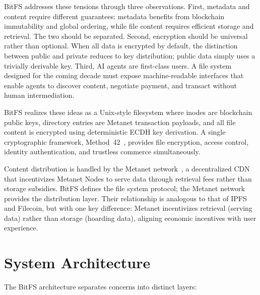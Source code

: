 \documentclass[11pt,a4paper]{article}
\begin{document}
BitFS addresses these tensions through three observations. First, metadata and content require different guarantees: metadata benefits from blockchain immutability and global ordering, while file content requires efficient storage and retrieval. The two should be separated. Second, encryption should be universal rather than optional. When all data is encrypted by default, the distinction between public and private reduces to key distribution; public data simply uses a trivially derivable key. Third, AI agents are first-class users. A file system designed for the coming decade must expose machine-readable interfaces that enable agents to discover content, negotiate payment, and transact without human intermediation.

BitFS realizes these ideas as a Unix-style filesystem where inodes are blockchain public keys, directory entries are Metanet transaction payloads, and all file content is encrypted using deterministic ECDH key derivation. A single cryptographic framework, Method~42~\cite{method42}, provides file encryption, access control, identity authentication, and trustless commerce simultaneously.

Content distribution is handled by the Metanet network~\cite{metanet_multi}, a decentralized CDN that incentivizes Metanet Nodes to serve data through retrieval fees rather than storage subsidies. BitFS defines the file system protocol; the Metanet network provides the distribution layer. Their relationship is analogous to that of IPFS and Filecoin, but with one key difference: Metanet incentivizes retrieval (serving data) rather than storage (hoarding data), aligning economic incentives with user experience.

\section{System Architecture}

The BitFS architecture separates concerns into distinct layers:
\end{document}
